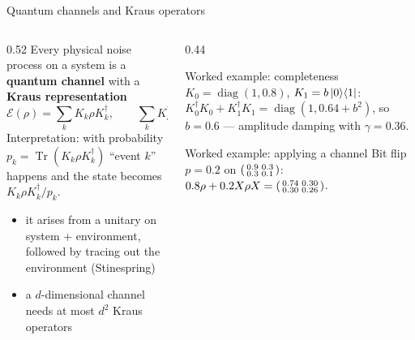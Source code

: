 \documentclass[aspectratio=169,11pt]{beamer}
\newcommand{\key}[1]{{\color{qdark}\textbf{#1}}}
\newcommand{\E}{\mathcal E}
\begin{document}
\begin{frame}[label=fChan]{Quantum channels and Kraus operators}
  \begin{columns}[T]
    \begin{column}{0.52\textwidth}
      \small
      Every physical noise process on a system is a \key{quantum channel} with a \key{Kraus representation}
      \[ \E(\rho) = \sum_kK_k\rho K_k^\dagger,\qquad \sum_kK_k^\dagger K_k = I. \]
      Interpretation: with probability $p_k = \operatorname{Tr}(K_k\rho K_k^\dagger)$ ``event $k$'' happens and the state becomes $K_k\rho K_k^\dagger/p_k$.
      \begin{itemize}\itemsep0pt\scriptsize
        \item it arises from a unitary on system + environment, followed by tracing out the environment (Stinespring)
        \item a $d$-dimensional channel needs at most $d^2$ Kraus operators
      \end{itemize}
    \end{column}
    \begin{column}{0.44\textwidth}
      \begin{exampleblock}{Worked example: completeness}
        \scriptsize $K_0 = \operatorname{diag}(1, 0.8)$, $K_1 = b\ket0\!\bra1$: $K_0^\dagger K_0 + K_1^\dagger K_1 = \operatorname{diag}(1, 0.64 + b^2)$, so $b = 0.6$
        --- amplitude damping with $\gamma = 0.36$.
      \end{exampleblock}
      \begin{exampleblock}{Worked example: applying a channel}
        \scriptsize Bit flip $p = 0.2$ on $\begin{psmallmatrix}0.9&0.3\\0.3&0.1\end{psmallmatrix}$: $0.8\rho + 0.2X\rho X = \begin{psmallmatrix}0.74&0.30\\0.30&0.26\end{psmallmatrix}$.
      \end{exampleblock}
    \end{column}
  \end{columns}
\end{frame}
\end{document}
